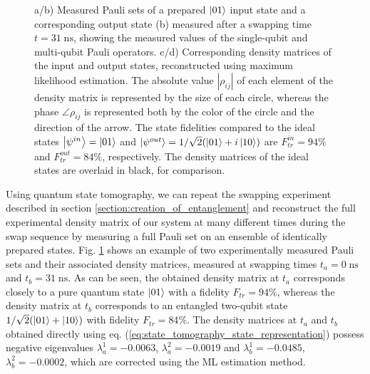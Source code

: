 \begin{figure}[ht!]
\begin{tabular}{ll}
	\end{tabular}
	\caption[]{a/b) Measured Pauli sets of a prepared $\left| 01 \right>$ input state and a corresponding output state (b) measured after a swapping time $t=31\;\mathrm{ns}$, showing the measured values of the single-qubit and multi-qubit Pauli operators. c/d) Corresponding density matrices of the input and output states, reconstructed using maximum likelihood estimation. The absolute value $|\rho_{ij}|$ of each element of the density matrix is represented by the size of each circle, whereas the phase $\angle \rho_{ij}$ is represented both by the color of the circle and the direction of the arrow. The state fidelities compared to the ideal states $\left| \psi^{in} \right>=\left| 01 \right>$ and $\left| \psi^{out} \right>=1/\sqrt{2}(\left| 01 \right>+i\left| 10 \right>)$ are $F^{in}_{tr}=94\%$ and $F^{out}_{tr}=84\%$, respectively. The density matrices of the ideal states are overlaid in black, for comparison.}
	\label{fig:pauli_set_example}
\end{figure}

Using quantum state tomography, we can repeat the swapping experiment described in section \ref{section:creation_of_entanglement} and reconstruct the full experimental density matrix of our system at many different times during the swap sequence by measuring a full Pauli set on an ensemble of identically prepared states. Fig. \ref{fig:pauli_set_example} shows an example of two experimentally measured Pauli sets and their associated density matrices, measured at swapping times $t_a=0\;\mathrm{ns}$ and $t_b= 31\;\mathrm{ns}$. As can be seen, the obtained density matrix at $t_a$ corresponds closely to a pure quantum state $\left| 01 \right>$ with a fidelity $F_{tr}=94\%$, whereas the density matrix at $t_b$ corresponds to an entangled two-qubit state $1/\sqrt{2}(\left| 01 \right>+\left| 10 \right>)$ with fidelity $F_{tr}=84\%$. The density matrices at $t_a$ and $t_b$ obtained directly using eq. (\ref{eq:state_tomography_state_representation}) possess negative eigenvalues $\lambda_{a}^1=-0.0063$, $\lambda_a^2=-0.0019$ and $\lambda_b^1=-0.0485$, $\lambda_b^2=-0.0002$, which are corrected using the ML estimation method.

\smallskip

